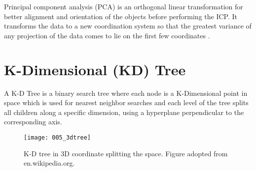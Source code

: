 \documentclass[../structure.tex]{subfiles}
\begin{document}
Principal component analysis (PCA) is an orthogonal linear transformation for better alignment and orientation of the objects before performing the ICP.  It transforms the data to a new coordination system so that the greatest variance of any projection of the data comes to lie on the first few coordinates \cite{Jolliffe2002}.


\section{K-Dimensional (KD) Tree}

A K-D Tree is a binary search tree where each node is a K-Dimensional point in space which is used for nearest neighbor searches and each level of the tree splits all children along a specific dimension, using a hyperplane perpendicular to the corresponding axis.

\begin{figure}[h!]
	\centering
	\texttt{[image: 005\_3dtree]}
	\captionsetup{justification=centering}
	\caption{K-D tree in 3D coordinate splitting the space. Figure adopted from en.wikipedia.org.}
	\label{fig:k_d_tree}
\end{figure}
\end{document}
